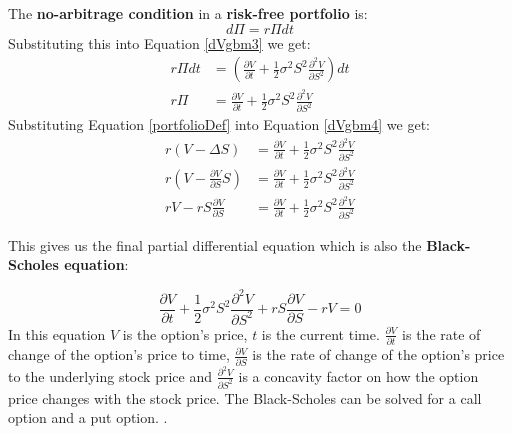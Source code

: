 \documentclass[12pt]{article}
\numberwithin{equation}{section}
\begin{document}
The \textbf{no-arbitrage condition} in a \textbf{risk-free portfolio} is:
\begin{equation}
	d\Pi = r\Pi dt
	\label{riskfreearbritrage}
\end{equation}
Substituting this into Equation \ref{dVgbm3} we get:
\begin{equation}
\begin{aligned}
	r\Pi dt &= (\frac{\partial V}{\partial t} + 
	\frac{1}{2}\sigma^2S^2\frac{\partial^2 V}{\partial S^2}) dt \\
	r\Pi &= \frac{\partial V}{\partial t} + 
	\frac{1}{2}\sigma^2S^2\frac{\partial^2 V}{\partial S^2} 
\end{aligned}
\label{dVgbm4}
\end{equation}
Substituting Equation \ref{portfolioDef} into Equation \ref{dVgbm4} we get:
\begin{equation}
	\begin{aligned}
		r(V - \Delta S)&= \frac{\partial V}{\partial t} + 
		\frac{1}{2}\sigma^2S^2\frac{\partial^2 V}{\partial S^2} \\
		r(V - \frac{\partial V}{\partial S} S)&= \frac{\partial V}{\partial t} + 
		\frac{1}{2}\sigma^2S^2\frac{\partial^2 V}{\partial S^2}  \\
		rV - rS\frac{\partial V}{\partial S} &= \frac{\partial V}{\partial t} + 
		\frac{1}{2}\sigma^2S^2\frac{\partial^2 V}{\partial S^2} 
	\end{aligned} 
	\label{dVgbm5}
\end{equation}

This gives us the final partial differential equation which is also the \textbf{Black-Scholes equation}: 

   \begin{equation} 
\boxed{\frac{\partial V}{\partial t} + \frac{1}{2} \sigma^2 S^2 \frac{\partial^2 V}{\partial S^2} + rS\frac{\partial V}{\partial S} - rV = 0 }
   \end{equation}
\newline
 In this equation $V$ is the option's price, $t$ is the current time. 
 \newline $\frac{\partial V}{\partial t} $ is the rate of change of the option's price to time, $\frac{\partial V}{\partial S}$ is the rate of change of the option's price to the underlying stock price and  $\frac{\partial^2 V}{\partial S^2}$ is a concavity factor on how the option price changes with the stock price. The Black-Scholes can be solved for a call option and a put option. \cite{haugh2016BlackScholes}.
 \newpage
\end{document}
